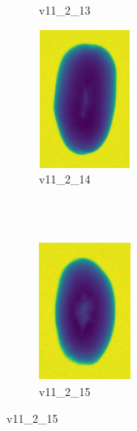 \documentclass[11pt]{article}
\begin{document}
\begin{figure}
\begin{subfigure}[b]{0.15\textwidth}
        \caption{v11\_2\_13}
         \label{fig:five over x}
     \end{subfigure}
     \hfill
    \begin{subfigure}[b]{0.15\textwidth}
         \centering
         \includegraphics[width=3cm, height=4.5cm]{images/kartofler/v11_2_14_cut.png}
        \caption{v11\_2\_14}
         \label{fig:five over x}
     \end{subfigure}
     
     
     \\ \\
     
     
    \begin{subfigure}[b]{0.15\textwidth}
         \centering
         \includegraphics[width=3cm, height=4.5cm]{images/kartofler/v11_2_15_cut.png}
         \caption{v11\_2\_15}
         \label{fig:y equals x}
     \end{subfigure}
\end{figure}





\newpage
\end{document}
